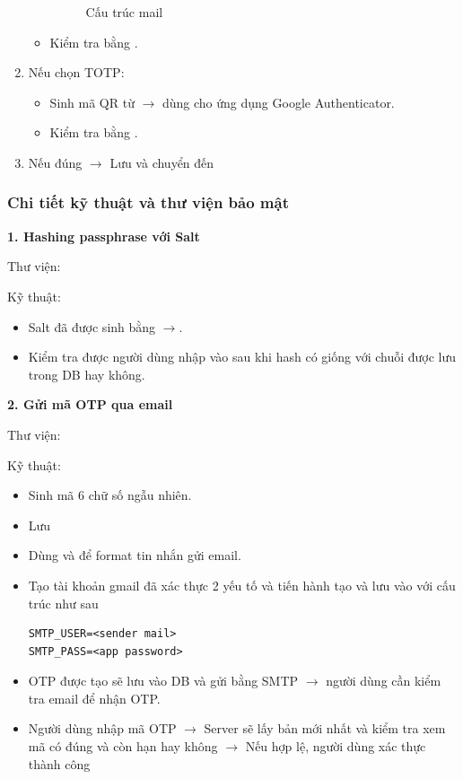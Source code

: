 \begin{enumerate}
\begin{itemize}
\begin{figure}[H]
        \caption{Cấu trúc mail}
        \label{fig:mail_recovery_ui}
        \end{figure}
        \item Kiểm tra bằng .
    \end{itemize}
    \item Nếu chọn TOTP:
    \begin{itemize}
        \item Sinh mã QR từ  $\rightarrow$ dùng cho ứng dụng Google Authenticator.
        \item Kiểm tra bằng .
    \end{itemize}
    \item Nếu đúng $\rightarrow$ Lưu  và chuyển đến 
\end{enumerate}

\subsubsection*{Chi tiết kỹ thuật và thư viện bảo mật}
\textbf{1. Hashing passphrase với Salt}

Thư viện:  

Kỹ thuật:
\begin{itemize}
    \item Salt đã được sinh bằng  $\rightarrow$.
    \item Kiểm tra  được người dùng nhập vào sau khi hash có giống với chuỗi được lưu trong DB hay không.
\end{itemize}

\textbf{2. Gửi mã OTP qua email}

Thư viện:  

Kỹ thuật:
\begin{itemize}
    \item Sinh mã 6 chữ số ngẫu nhiên.
    \item Lưu 
    \item Dùng  và  để format tin nhắn gửi email.
    \item Tạo tài khoản gmail đã xác thực 2 yếu tố và tiến hành tạo  và lưu vào  với cấu trúc như sau
\begin{lstlisting}
SMTP_USER=<sender mail>
SMTP_PASS=<app password>
\end{lstlisting}
    \item OTP được tạo sẽ lưu vào DB và gửi bằng SMTP $\rightarrow$ người dùng cần kiểm tra email để nhận OTP.
    \item Người dùng nhập mã OTP $\rightarrow$ Server sẽ lấy bản  mới nhất và kiểm tra xem mã có đúng và còn hạn hay không $\rightarrow$ Nếu hợp lệ, người dùng xác thực thành công
\end{itemize}

